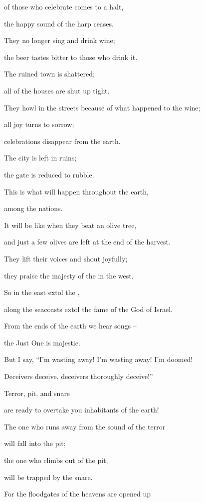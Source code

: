 {of those who celebrate
comes to a halt,
\par }{\Q the happy sound
of the harp
ceases.
\par }{\Q {}They no
longer sing
and drink
wine;
\par }{\Q the beer
tastes bitter
to those who drink it.
\par }{\Q {}The ruined
town
is shattered;
\par }{\Q all
of the houses
are shut up
tight.
\par }{\Q {}They howl
in
the streets
because of what happened to the wine;
\par }{\Q all
joy
turns to sorrow;
\par }{\Q celebrations
disappear
from the earth.
\par }{\Q {}The city
is left
in ruins;
\par }{\Q the gate
is reduced
to rubble.
\par }{\Q {}This
is what
will happen
throughout
the earth,
\par }{\Q among
the nations.
\par }{\Q It will be like when they beat
an olive tree,
\par }{\Q and just a few olives
are left
at the end
of the harvest.
\par }{\Q {}They
lift
their voices
and shout
joyfully;
\par }{\Q they praise
the majesty
of the
{}
in the west.
\par }{\Q {}So
in the east
extol the
{},
\par }{\Q along the seacoasts
extol the fame
of the {}
God
of Israel.
\par }{\Q {}From the ends
of the earth
we hear
songs
–
\par }{\Q the Just One
is majestic.
\par }{\Q But I say,
“I’m wasting away! I’m wasting away! I’m doomed!
\par }{\Q Deceivers
deceive,
deceivers thoroughly deceive!”
\par }{\Q {}Terror,
pit,
and snare
\par }{\Q are ready to overtake you inhabitants
of the earth!
\par }{\Q {}The one who runs away from
the sound
of the terror
\par }{\Q will fall
into the pit;
\par }{\Q the one who climbs out of the pit,
\par }{\Q will be
trapped by
the snare.
\par }{\Q For
the floodgates
of the heavens
are opened
up

}
